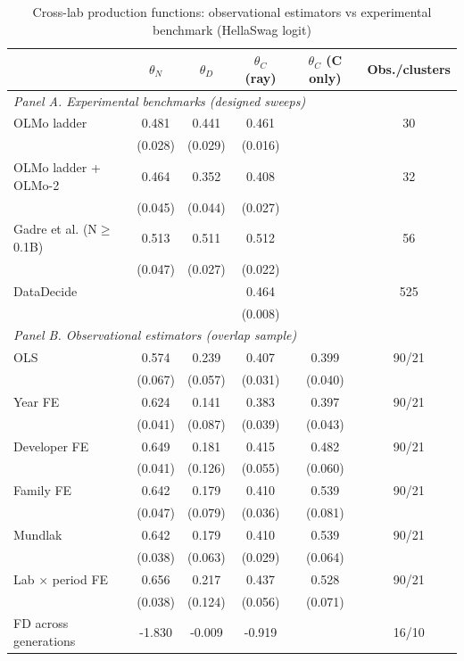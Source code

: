 \begin{table}[!htbp]
\centering
\scriptsize
\begin{threeparttable}
\caption{Cross-lab production functions: observational estimators vs experimental benchmark (HellaSwag logit)}
\label{tab:table6b_global_overlap}
\begin{tabular}{lccccc}
\toprule
 & $\theta_N$ & $\theta_D$ & $\theta_C$ (ray) & $\theta_C$ (C only) & Obs./clusters \\
\midrule
\multicolumn{6}{l}{\textit{Panel A. Experimental benchmarks (designed sweeps)}} \\
OLMo ladder & 0.481 & 0.441 & 0.461 &  & 30 \\
 & (0.028) & (0.029) & (0.016) &  &  \\
OLMo ladder + OLMo-2 & 0.464 & 0.352 & 0.408 &  & 32 \\
 & (0.045) & (0.044) & (0.027) &  &  \\
Gadre et al. (N$\geq$0.1B) & 0.513 & 0.511 & 0.512 &  & 56 \\
 & (0.047) & (0.027) & (0.022) &  &  \\
DataDecide &  &  & 0.464 &  & 525 \\
 &  &  & (0.008) &  &  \\
\midrule
\multicolumn{6}{l}{\textit{Panel B. Observational estimators (overlap sample)}} \\
OLS & 0.574 & 0.239 & 0.407 & 0.399 & 90/21 \\
 & (0.067) & (0.057) & (0.031) & (0.040) &  \\
Year FE & 0.624 & 0.141 & 0.383 & 0.397 & 90/21 \\
 & (0.041) & (0.087) & (0.039) & (0.043) &  \\
Developer FE & 0.649 & 0.181 & 0.415 & 0.482 & 90/21 \\
 & (0.041) & (0.126) & (0.055) & (0.060) &  \\
Family FE & 0.642 & 0.179 & 0.410 & 0.539 & 90/21 \\
 & (0.047) & (0.079) & (0.036) & (0.081) &  \\
Mundlak & 0.642 & 0.179 & 0.410 & 0.539 & 90/21 \\
 & (0.038) & (0.063) & (0.029) & (0.064) &  \\
Lab $\times$ period FE & 0.656 & 0.217 & 0.437 & 0.528 & 90/21 \\
 & (0.038) & (0.124) & (0.056) & (0.071) &  \\
FD across generations & -1.830 & -0.009 & -0.919 &  & 16/10 \\

\end{tabular}
\end{threeparttable}
\end{table}
